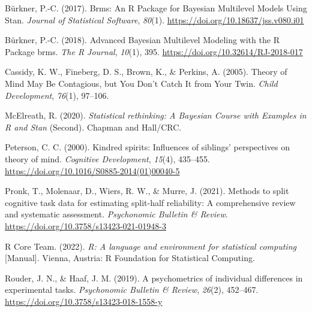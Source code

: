 \documentclass[
  man,floatsintext]{apa6}
\newlength{\cslhangindent}
\newlength{\cslentryspacingunit} %
\newenvironment{CSLReferences}[2] %
 {%
  \setlength{\parindent}{0pt}
  \ifodd #1
  \let\oldpar\par
  \def\par{\hangindent=\cslhangindent\oldpar}
  \fi
  \setlength{\parskip}{#2\cslentryspacingunit}
 }%
 {}
\begin{document}
\hypertarget{refs}{}
\begin{CSLReferences}{1}{0}
\leavevmode{}%
Bürkner, P.-C. (2017). Brms: {An R Package} for {Bayesian Multilevel Models Using Stan}. \emph{Journal of Statistical Software}, \emph{80}(1). \url{https://doi.org/10.18637/jss.v080.i01}

\leavevmode{}%
Bürkner, P.-C. (2018). Advanced {Bayesian Multilevel Modeling} with the {R Package} brms. \emph{The R Journal}, \emph{10}(1), 395. \url{https://doi.org/10.32614/RJ-2018-017}

\leavevmode{}%
Cassidy, K. W., Fineberg, D. S., Brown, K., \& Perkins, A. (2005). Theory of {Mind May Be Contagious}, but {You Don}'t {Catch It} from {Your Twin}. \emph{Child Development}, \emph{76}(1), 97--106.

\leavevmode{}%
McElreath, R. (2020). \emph{Statistical rethinking: {A Bayesian Course} with {Examples} in {R} and {Stan}} (Second). {Chapman and Hall/CRC}.

\leavevmode{}%
Peterson, C. C. (2000). Kindred spirits: {Influences} of siblings' perspectives on theory of mind. \emph{Cognitive Development}, \emph{15}(4), 435--455. \url{https://doi.org/10.1016/S0885-2014(01)00040-5}

\leavevmode{}%
Pronk, T., Molenaar, D., Wiers, R. W., \& Murre, J. (2021). Methods to split cognitive task data for estimating split-half reliability: {A} comprehensive review and systematic assessment. \emph{Psychonomic Bulletin \& Review}. \url{https://doi.org/10.3758/s13423-021-01948-3}

\leavevmode{}%
R Core Team. (2022). \emph{R: {A} language and environment for statistical computing} {[}Manual{]}. {Vienna, Austria}: {R Foundation for Statistical Computing}.

\leavevmode{}%
Rouder, J. N., \& Haaf, J. M. (2019). A psychometrics of individual differences in experimental tasks. \emph{Psychonomic Bulletin \& Review}, \emph{26}(2), 452--467. \url{https://doi.org/10.3758/s13423-018-1558-y}

\end{CSLReferences}
\end{document}
